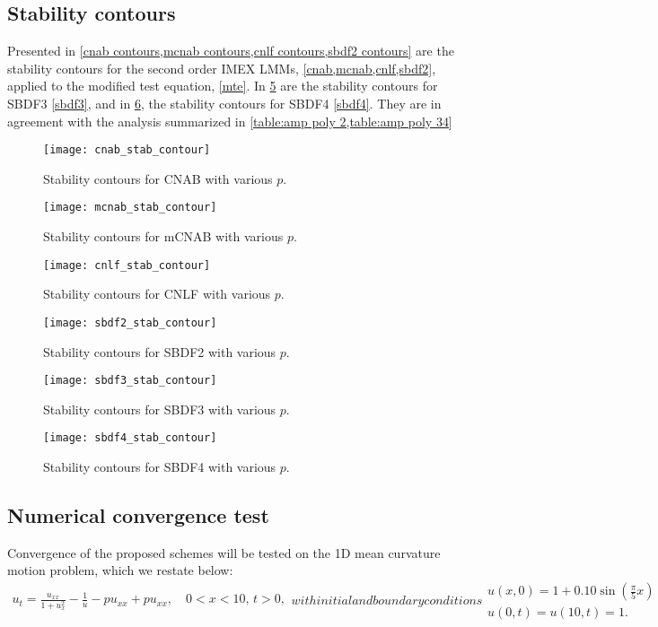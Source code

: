 \subsection{Stability contours}
Presented in \cref{cnab contours,mcnab contours,cnlf contours,sbdf2 contours} are the stability contours for the second order IMEX LMMs, \cref{cnab,mcnab,cnlf,sbdf2}, applied to the modified test equation, \cref{mte}. In \cref{sbdf3 contours} are the stability contours for SBDF3 \cref{sbdf3}, and in \cref{sbdf4 contours}, the stability contours for SBDF4 \cref{sbdf4}. They are in agreement with the analysis summarized in \cref{table:amp poly 2,table:amp poly 34}
\begin{figure}[htb!]
        \centering
\texttt{[image: cnab\_stab\_contour]}
\caption{Stability contours for CNAB with various $p$.}
\label{cnab contours}
\end{figure}
\begin{figure}[htb!]
        \centering
\texttt{[image: mcnab\_stab\_contour]}
\caption{Stability contours for mCNAB with various $p$.}
\label{mcnab contours}
\end{figure}
\begin{figure}[htb!]
        \centering
\texttt{[image: cnlf\_stab\_contour]}
\caption{Stability contours for CNLF with various $p$.}
\label{cnlf contours}
\end{figure}
\begin{figure}[htb!]
        \centering
\texttt{[image: sbdf2\_stab\_contour]}
\caption{Stability contours for SBDF2 with various $p$.}
\label{sbdf2 contours}
\end{figure}

\begin{figure}[htb!]
        \centering
\texttt{[image: sbdf3\_stab\_contour]}
\caption{Stability contours for SBDF3 with various $p$.}
\label{sbdf3 contours}
\end{figure}

\begin{figure}[htb!]
        \centering
\texttt{[image: sbdf4\_stab\_contour]}
\caption{Stability contours for SBDF4 with various $p$.}
\label{sbdf4 contours}
\end{figure}

\subsection{Numerical convergence test}
Convergence of the proposed schemes will be tested on the 1D mean curvature motion problem, which we restate below:
\begin{subequations}
\begin{align}
        u_t = \frac{u_{xx}}{1 + u_x^2} - \frac{1}{u} - pu_{xx} + pu_{xx},
\quad 0< x< 10,\, t>0,
\end{align}
with initial and boundary conditions
\begin{gather}
        u(x,0) = 1 + 0.10\sin\left(\frac{\pi}{5}x \right) 
\\
u(0,t) = u(10,t) = 1.
\end{gather}
\label{ammc pmpm}
\end{subequations}

